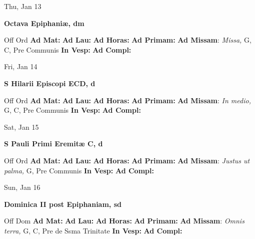 \documentclass[10pt]{article}
\begin{document}
\begin{minipage}{3.5in}
\vspace{2em}\begin{center}
Thu, Jan 13
\end{center}\textbf{ \large Octava Epiphaniæ, \textnormal{\normalsize dm}}
\begin{justify}
Off Ord
\textbf{Ad Mat: }
\textbf{Ad Lau: }
\textbf{Ad Horas: }
\textbf{Ad Primam: }
\textbf{Ad Missam}: \textit{Missa,} G, C, Pre Communis
\textbf{In Vesp: }
\textbf{Ad Compl: }\end{justify}
\end{minipage}



\begin{minipage}{3.5in}
\vspace{2em}\begin{center}
Fri, Jan 14
\end{center}\textbf{ \large S Hilarii Episcopi ECD, \textnormal{\normalsize d}}
\begin{justify}
Off Ord
\textbf{Ad Mat: }
\textbf{Ad Lau: }
\textbf{Ad Horas: }
\textbf{Ad Primam: }
\textbf{Ad Missam}: \textit{In medio,} G, C, Pre Communis
\textbf{In Vesp: }
\textbf{Ad Compl: }\end{justify}
\end{minipage}



\begin{minipage}{3.5in}
\vspace{2em}\begin{center}
Sat, Jan 15
\end{center}\textbf{ \large S Pauli Primi Eremitæ C, \textnormal{\normalsize d}}
\begin{justify}
Off Ord
\textbf{Ad Mat: }
\textbf{Ad Lau: }
\textbf{Ad Horas: }
\textbf{Ad Primam: }
\textbf{Ad Missam}: \textit{Justus ut palma,} G, Pre Communis
\textbf{In Vesp: }
\textbf{Ad Compl: }\end{justify}
\end{minipage}



\begin{minipage}{3.5in}
\vspace{2em}\begin{center}
Sun, Jan 16
\end{center}\textbf{ \large Dominica II post Epiphaniam, \textnormal{\normalsize sd}}
\begin{justify}
Off Dom
\textbf{Ad Mat: }
\textbf{Ad Lau: }
\textbf{Ad Horas: }
\textbf{Ad Primam: }
\textbf{Ad Missam}: \textit{Omnis terra,} G, C, Pre de Ssma Trinitate
\textbf{In Vesp: }
\textbf{Ad Compl: }\end{justify}
\end{minipage}
\end{document}
